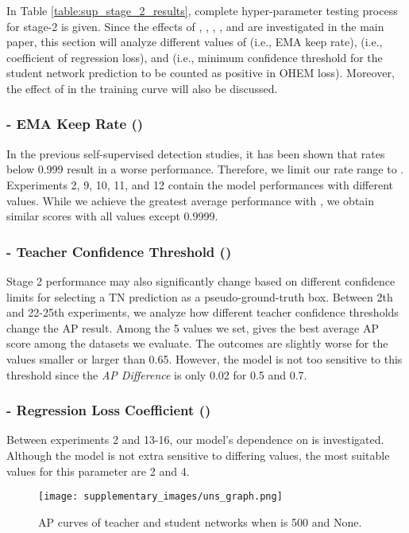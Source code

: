 \documentclass{article}
\begin{document}
In Table \ref{table:sup_stage_2_results}, complete hyper-parameter testing process for stage-2 is given. Since the effects of , , , , and  are investigated in the main paper, this section will analyze different values of  (i.e., EMA keep rate),  (i.e., coefficient of regression loss), and  (i.e., minimum confidence threshold for the student network prediction to be counted as positive in OHEM loss). Moreover, the effect of  in the training curve will also be discussed.

\subsubsection{- EMA Keep Rate ()} 

In the previous self-supervised detection studies, it has been shown that rates below 0.999 result in a worse performance. Therefore, we limit our rate range to . Experiments 2, 9, 10, 11, and 12 contain the model performances with different  values. While we achieve the greatest average performance with , we obtain similar scores with all values except 0.9999.

\subsubsection{- Teacher Confidence Threshold ()} 

Stage 2 performance may also significantly change based on different confidence limits for selecting a TN prediction as a pseudo-ground-truth box. Between 2th and 22-25th experiments, we analyze how different teacher confidence thresholds change the AP result. Among the 5 values we set,  gives the best average AP score among the datasets we evaluate. The outcomes are slightly worse for the values smaller or larger than 0.65. However, the model is not too sensitive to this threshold since the \textit{AP Difference} is only 0.02 for 0.5 and 0.7.

\subsubsection{- Regression Loss Coefficient ()}

Between experiments 2 and 13-16, our model's dependence on  is investigated. Although the model is not extra sensitive to differing  values, the most suitable values for this parameter are 2 and 4.

\begin{figure*}[ht]
    \centering
    \texttt{[image: supplementary\_images/uns\_graph.png]}
    \caption{AP curves of teacher and student networks when  is 500 and None.}
    \label{fig:uns_graph}
\end{figure*}
\end{document}
